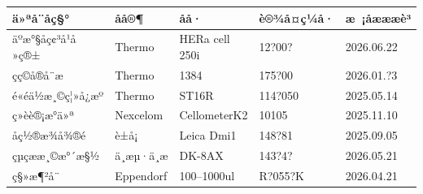 \documentclass[UTF8,10pt,a4paper,fontset=fandol]{ctexart}
\newcommand{\fieldvalue}[1]{#1}
\newcommand{\handwritten}[1]{#1}
\begin{document}
\begin{center}
\begin{center}
\begin{tabularx}{\textwidth}{|X|X|X|X|X|}
\hline
ä»ªå¨åç§° & åå®¶ & åå· & è®¾å¤ç¼å· & æ ¡åæææè³\\
\hline
äºæ°§åç¢³å¹å»ç®± & Thermo & HERa cell 250i &
\fieldvalue{\handwritten{12?00?}} &
\fieldvalue{\handwritten{2026.06.22}}\\
\hline
çç©å®å¨æ & Thermo & 1384 &
\fieldvalue{\handwritten{175?00}} &
\fieldvalue{\handwritten{2026.01.?3}}\\
\hline
é«éä½æ¸©ç¦»å¿æº & Thermo & ST16R &
\fieldvalue{\handwritten{114?050}} &
\fieldvalue{\handwritten{2025.05.14}}\\
\hline
ç»èè®¡æ°ä»ª & Nexcelom & CellometerK2 &
\fieldvalue{\handwritten{10105}} &
\fieldvalue{\handwritten{2025.11.10}}\\
\hline
åç½®æ¾å¾®é & è±å¡ & Leica Dmi1 &
\fieldvalue{\handwritten{148?81}} &
\fieldvalue{\handwritten{2025.09.05}}\\
\hline
çµç­ææ¸©æ°´æ§½ & ä¸æµ·ä¸æ & DK-8AX &
\fieldvalue{\handwritten{143?4?}} &
\fieldvalue{\handwritten{2026.05.21}}\\
\hline
ç§»æ¶²å¨ & Eppendorf &
\fieldvalue{\handwritten{100--1000ul}} &
\fieldvalue{\handwritten{R?055?K}} &
\fieldvalue{\handwritten{2026.04.21}}\\
\hline
\end{tabularx}


\end{center}
\end{center}
\end{document}
